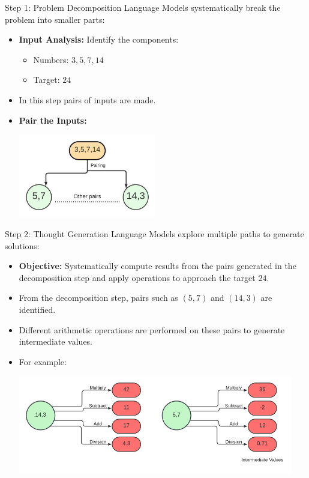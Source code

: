 \documentclass[aspectratio=169, xcolor={dvipsnames}, 10pt, brazil]{beamer}
\begin{document}
\begin{frame}{Step 1: Problem Decomposition}
    Language Models systematically break the problem into smaller parts:
    \begin{itemize}
        \item \textbf{Input Analysis:} Identify the components:
        \begin{itemize}
            \item Numbers: \(3, 5, 7, 14\)
            \item Target: \(24\)
        \end{itemize}
        \pause
        \item In this step pairs of inputs are made.
        \item \textbf{Pair the Inputs:}
        \begin{center}
            \includegraphics[width=6cm]{ImagesAlif/Org chart.jpeg}
        \end{center}
    \end{itemize}
\end{frame}
\begin{frame}{Step 2: Thought Generation}
    Language Models explore multiple paths to generate solutions:
    \begin{itemize}
        \item \textbf{Objective:} Systematically compute results from the pairs generated in the decomposition step and apply operations to approach the target \(24\).
        \pause
        \item From the decomposition step, pairs such as \((5, 7)\) and \((14, 3)\) are identified.
        \pause
        \item Different arithmetic operations are performed on these pairs to generate intermediate values. 
        \item For example:
        \begin{center}
            \includegraphics[width=12cm]{ImagesAlif/Org chart.png}
        \end{center}
    \end{itemize}
\end{frame}
\end{document}
